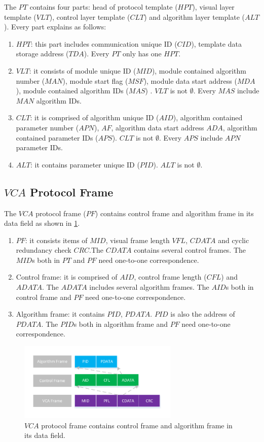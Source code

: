 \documentclass[journal,UTF8]{IEEEtran}
\begin{document}
 The $PT$ contains four parts: head of protocol template ($HPT$), visual layer template ($VLT$), control layer template ($CLT$) and algorithm layer template ($ALT$). Every part explains as follows: 
 \begin{enumerate}
 	\item $HPT$: this part includes communication unique ID ($CID$), template data storage address ($TDA$). Every $PT$ only has one $HPT$.
 	\item $VLT$: it consists of module unique ID ($MID$), module contained algorithm number ($MAN$), module start flag ($MSF$), module data start address ($MDA$), module contained algorithm IDs ($MAS$) . $VLT$ is not $\emptyset$. Every $MAS$ include $MAN$ algorithm IDs. 
 	\item $CLT$: it is comprised of algorithm unique ID ($AID$), algorithm contained parameter number ($APN$), $AF$, algorithm data start address $ADA$, algorithm contained parameter IDs ($APS$). $CLT$ is not $\emptyset$. Every $APS$ include $APN$ parameter IDs.
 	\item $ALT$: it contains parameter unique ID ($PID$). $ALT$ is not $\emptyset$. 
 \end{enumerate}
 \subsection{$VCA$ Protocol Frame}
 The $VCA$ protocol frame ($PF$) contains control frame and algorithm frame in its data field as shown in \ref{fig:Protocol}. 

 \begin{enumerate}
	\item $PF$: it consists items of $MID$, visual frame length $VFL$, $CDATA$ and cyclic redundancy check $CRC$.The $CDATA$ contains several control frames. The $MID$s both in $PT$ and $PF$ need one-to-one correspondence.
	\item Control frame: it is comprised of $AID$, control frame length ($CFL$) and $ADATA$.
	The $ADATA$ includes several algorithm frames. The $AID$s both in control frame and $PF$ need one-to-one correspondence.
	\item Algorithm frame: it contains $PID$, $PDATA$. $PID$ is also the address of $PDATA$. The $PID$s both in algorithm frame and $PF$ need one-to-one correspondence.
\end{enumerate}


\begin{figure}
	\centering
	\includegraphics[width=3in]{fig/Protocol.pdf}
	\caption{ $VCA$ protocol frame contains control frame and algorithm frame in its data field.}
	\label{fig:Protocol}
\end{figure}
\end{document}
